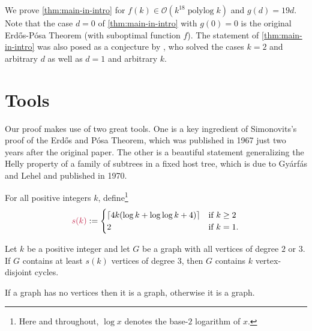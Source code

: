 \documentclass{patmorin}
\DeclareMathOperator{\polylog}{polylog}
\newcommand{\Oh}{\mathcal{O}}
\begin{document}
We prove \cref{thm:main-in-intro} for $f(k)\in\Oh(k^{18}\polylog k)$ and $g(d)=19d$. Note that the case $d=0$ of \cref{thm:main-in-intro} with $g(0)=0$ is the original Erd\H{o}s-Pósa Theorem (with suboptimal function $f$). The statement of \cref{thm:main-in-intro} was also posed as a conjecture by \citet{ahn.gollin:coarse}, who solved the cases $k=2$ and arbitrary $d$ as well as $d=1$ and arbitrary $k$.


\section{Tools}

Our proof makes use of two great tools. One is a key ingredient of Simonovits's~\cite{Simonovits67} proof of the Erdős and Pósa Theorem, which was published in 1967 just two years after the original paper. The other is a beautiful statement generalizing the Helly property of a family of subtrees in a fixed host tree, which is due to Gyárfás and Lehel and published in 1970.


For all positive integers $k$, define\footnote{Here and throughout, $\log x$ denotes the base-$2$ logarithm of $x$.}
\[
  \mathdefin{s(k)}:=
    \begin{cases}
      \lceil 4k(\log k + \log\log k +4)\rceil & \textrm{if $k\geq2$}\\
      2 & \textrm{if $k=1$.}
    \end{cases}
\]

\begin{thm}\label{thm:simonovits}
  Let $k$ be a positive integer and let $G$ be a graph with all vertices of degree $2$ or $3$. If $G$ contains at least $s(k)$ vertices of degree $3$, then $G$ contains $k$ vertex-disjoint cycles.
\end{thm}

If a graph has no vertices then it is a  graph, otherwise it is a  graph.


\end{document}
